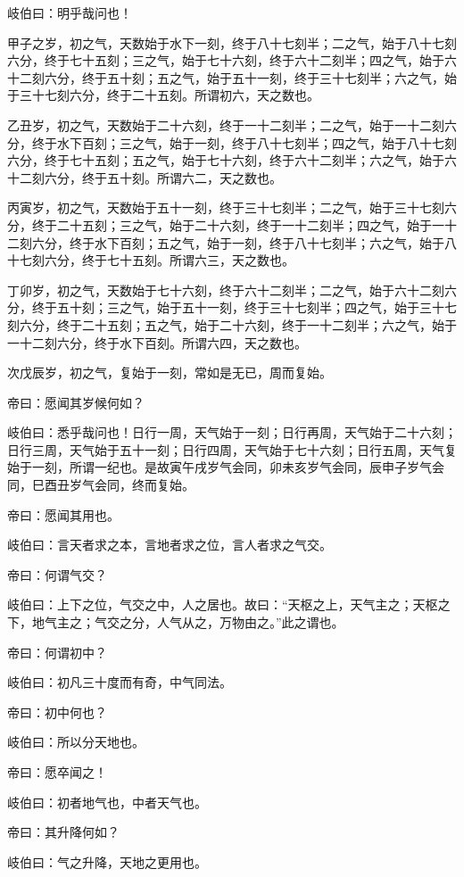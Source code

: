 \documentclass{article}%
\begin{document}
岐伯曰：明乎哉问也！

甲子之岁，初之气，天数始于水下一刻，终于八十七刻半；二之气，始于八十七刻六分，终于七十五刻；三之气，始于七十六刻，终于六十二刻半；四之气，始于六十二刻六分，终于五十刻；五之气，始于五十一刻，终于三十七刻半；六之气，始于三十七刻六分，终于二十五刻。所谓初六，天之数也。

乙丑岁，初之气，天数始于二十六刻，终于一十二刻半；二之气，始于一十二刻六分，终于水下百刻；三之气，始于一刻，终于八十七刻半；四之气，始于八十七刻六分，终于七十五刻；五之气，始于七十六刻，终于六十二刻半；六之气，始于六十二刻六分，终于五十刻。所谓六二，天之数也。

丙寅岁，初之气，天数始于五十一刻，终于三十七刻半；二之气，始于三十七刻六分，终于二十五刻；三之气，始于二十六刻，终于一十二刻半；四之气，始于一十二刻六分，终于水下百刻；五之气，始于一刻，终于八十七刻半；六之气，始于八十七刻六分，终于七十五刻。所谓六三，天之数也。

丁卯岁，初之气，天数始于七十六刻，终于六十二刻半；二之气，始于六十二刻六分，终于五十刻；三之气，始于五十一刻，终于三十七刻半；四之气，始于三十七刻六分，终于二十五刻；五之气，始于二十六刻，终于一十二刻半；六之气，始于一十二刻六分，终于水下百刻。所谓六四，天之数也。

次戊辰岁，初之气，复始于一刻，常如是无已，周而复始。

帝曰：愿闻其岁候何如？

岐伯曰：悉乎哉问也！日行一周，天气始于一刻；日行再周，天气始于二十六刻；日行三周，天气始于五十一刻；日行四周，天气始于七十六刻；日行五周，天气复始于一刻，所谓一纪也。是故寅午戌岁气会同，卯未亥岁气会同，辰申子岁气会同，巳酉丑岁气会同，终而复始。

帝曰：愿闻其用也。

岐伯曰：言天者求之本，言地者求之位，言人者求之气交。

帝曰：何谓气交？

岐伯曰：上下之位，气交之中，人之居也。故曰：“天枢之上，天气主之；天枢之下，地气主之；气交之分，人气从之，万物由之。”此之谓也。

帝曰：何谓初中？

岐伯曰：初凡三十度而有奇，中气同法。

帝曰：初中何也？

岐伯曰：所以分天地也。

帝曰：愿卒闻之！

岐伯曰：初者地气也，中者天气也。

帝曰：其升降何如？

岐伯曰：气之升降，天地之更用也。
\end{document}
